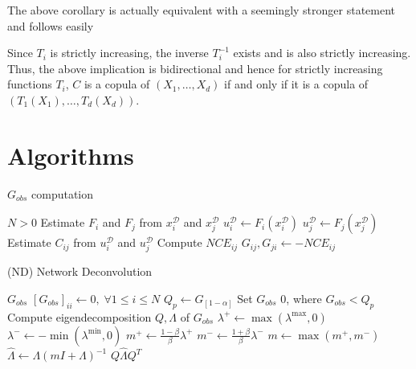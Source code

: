 \documentclass[../Thesis.tex]{subfiles}
\begin{document}
The above corollary is actually equivalent with a seemingly stronger statement and follows easily
\begin{proposition}
    Since $T_i$ is strictly increasing, the inverse $T_i^{-1}$ exists and is also strictly increasing. Thus, the above implication is bidirectional and hence for strictly increasing functions $T_i$, $C$ is a copula of $\left(X_1,\dots,X_d\right)$ if and only if it is a copula of $\left(T_1(X_1),\dots, T_d(X_d)\right)$.
\end{proposition}




\newpage
\section{Algorithms}
\begin{algorithm}[H]
    \caption{$G_{obs}$ computation}\label{alg:Gobs1}
    \begin{algorithmic}
        \Require $N > 0$             
        \State Estimate $F_i$ and $F_j$ from $x_i^{\mathcal{D}}$ and $x_j^{\mathcal{D}}$
        \State $u_i^{\mathcal{D}} \gets F_i(x_i^{\mathcal{D}})$
        \State $u_j^{\mathcal{D}} \gets F_j(x_j^{\mathcal{D}})$
        \State Estimate $C_{ij}$ from $u_i^{\mathcal{D}}$ and $u_j^{\mathcal{D}}$
        \State Compute $NCE_{ij}$
        \State $G_{ij}, G_{ji} \gets -NCE_{ij}$
        \EndFor
    \end{algorithmic}
\end{algorithm}



\begin{algorithm}
    \caption{(ND) Network Deconvolution}\label{alg:ND}
    \begin{algorithmic}
        \Require $G_{obs}$             
        \State $\left[G_{obs}\right]_{ii} \gets 0, \; \forall 1\leq i \leq N$                    
        \State $Q_p \gets G_{[1-\alpha]}$
        \State Set $G_{obs}$ 0, where $G_{obs} < Q_p$
        \State Compute eigendecomposition $Q,\Lambda$ of $G_{obs}$
        \State $\lambda^+ \gets  \max{ \left( \lambda^{\text{max}},0 \right) }$
        \State $\lambda^- \gets -\min{ \left( \lambda^{\text{min}},0 \right) }$
        \State $m^+ \gets \frac{1-\beta}{\beta} \lambda^+$
        \State $m^- \gets \frac{1+\beta}{\beta} \lambda^-$
        \State $m \gets \max{\left( m^+, m^- \right)}$
        \State $\hat{\Lambda} \gets \Lambda \left(mI + \Lambda\right)^{-1}$
        \State \Return $Q \hat{\Lambda} Q^T$
    \end{algorithmic}
\end{algorithm}
\end{document}
